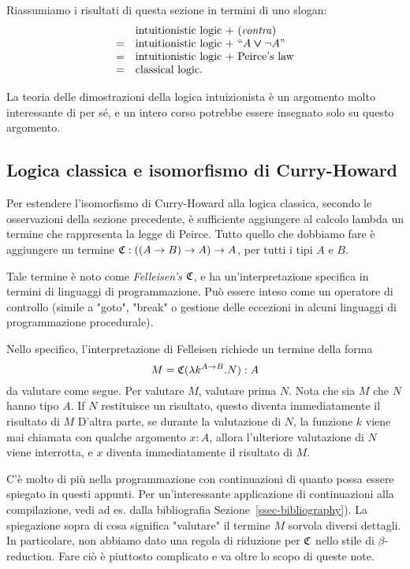 \documentclass{article}
\begin{document}
Riassumiamo i risultati di
questa sezione in termini di uno slogan:
\[ \begin{array}{ll}
&  \mbox{intuitionistic logic + \textrm{(\textit{contra\/})}} \\
=& \mbox{intuitionistic logic + ``$A\mathbin{\textrm{\rm\boldmath $\vee$}}\neg A$''} \\
=& \mbox{intuitionistic logic + Peirce's law} \\
=& \mbox{classical logic.}
\end{array}
\]

La teoria delle dimostrazioni della logica intuizionista \`e un argomento molto interessante
di per s\'e, e un intero corso potrebbe essere insegnato solo su questo
argomento.

\subsection{Logica classica e isomorfismo di Curry-Howard}

Per estendere l'isomorfismo di Curry-Howard alla logica classica, secondo le 
osservazioni della sezione precedente, \`e sufficiente aggiungere
al calcolo lambda un termine che rappresenta la legge di Peirce. Tutto
quello che dobbiamo fare \`e aggiungere un termine $\mathfrak{C}:((A\to B)\to A)\to A$, per tutti i tipi $A$
e $B$. 

Tale termine \`e noto come {\em Felleisen's $\mathfrak{C}$}, e ha un'interpretazione
specifica in termini di linguaggi di programmazione. Pu\`o essere inteso come
un operatore di controllo (simile a "goto", "break" o gestione delle eccezioni in alcuni linguaggi di programmazione procedurale).

Nello specifico, l'interpretazione di Felleisen richiede un termine della forma
\[ M = \mathfrak{C}(\lambda k^{A\to B}.N) : A
\]
da valutare come segue. Per valutare $M$, valutare prima $N$.  Nota
che sia $M$ che $N$ hanno tipo $A$. If $N$ restituisce un risultato, 
questo diventa immediatamente il risultato di $M$ D'altra parte, se durante la valutazione di 
$N$, la funzione $k$ viene mai chiamata con qualche argomento
$x:A$, allora l'ulteriore valutazione di $N$ viene interrotta,
e $x$ diventa immediatamente il risultato di $M$.

C'\`e molto di pi\`u nella programmazione con continuazioni di quanto possa essere spiegato 
in questi appunti. Per un'interessante applicazione di continuazioni alla compilazione, vedi 
ad es. {\cite{App92}} dalla  bibliografia Sezione~\ref{ssec-bibliography}). La spiegazione 
sopra di cosa significa "valutare" il termine $M$ sorvola diversi dettagli. In particolare, non 
abbiamo dato una regola di riduzione per $\mathfrak{C}$ nello stile di $\beta$-reduction. Fare ci\`o \`e 
piuttosto complicato e va oltre lo scopo di queste note.
\end{document}
